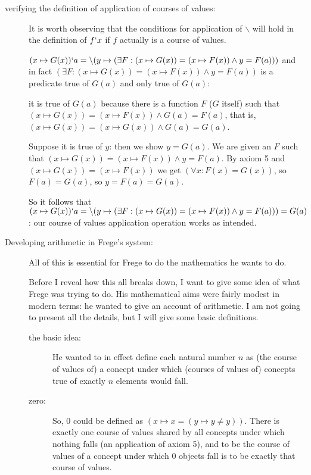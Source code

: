 \documentclass[12pt]{article}
\begin{document}
\begin{description}
\item[verifying the definition of application of courses of values:]  It is worth observing that the conditions for application of $\backslash$ will hold in the definition of $f`x$ if $f$ actually is a course of values.

$(x \mapsto G(x))`a = \backslash(y \mapsto (\exists F:(x \mapsto G(x)) = (x \mapsto F(x)) \wedge y = F(a)))$ and in fact  $(\exists F:(x \mapsto G(x)) = (x \mapsto F(x)) \wedge y = F(a))$
is a predicate true of $G(a)$ and only true of $G(a)$: 

it is true of $G(a)$ because there is a function $F$ ($G$ itself) such that $(x \mapsto G(x)) = (x \mapsto F(x)) \wedge G(a) = F(a)$, that is, $(x \mapsto G(x)) = (x \mapsto G(x)) \wedge G(a) = G(a)$.

Suppose it is true of $y$:  then we show $y=G(a)$.  We are given an $F$ such that $(x \mapsto G(x)) = (x \mapsto F(x)) \wedge y = F(a)$.  By axiom 5 and $(x \mapsto G(x)) = (x \mapsto F(x))$ we get $(\forall x:F(x)=G(x))$, so $F(a)=G(a)$, so $y=F(a)=G(a)$.

So it follows that $(x \mapsto G(x))`a = \backslash(y \mapsto (\exists F:(x \mapsto G(x)) = (x \mapsto F(x)) \wedge y = F(a))) = G(a)$:  our course of values application operation works as intended.

\item[Developing arithmetic in Frege's system:]

All of this is essential for Frege to do the mathematics he wants to do.  

Before I reveal how this all breaks down, I want to give some idea of what Frege was trying to do.  His mathematical aims were fairly modest in modern terms:  he wanted to give an account of arithmetic.  I am not going to present all the details, but I will give some basic definitions.

\begin{description}

\item[the basic idea:]  He wanted to in effect define each natural number $n$ as (the course of values of) a concept under which (courses of values of) concepts true of exactly $n$ elements would fall.

\item[zero:]  So, 0 could be defined as $(x \mapsto  x=(y \mapsto y \neq y))$.  There is exactly one course of values shared by all concepts under which nothing falls (an application of axiom 5), and to be the course of values of a concept under which 0 objects fall is to be exactly that course of values.


\end{description}
\end{description}
\end{document}

